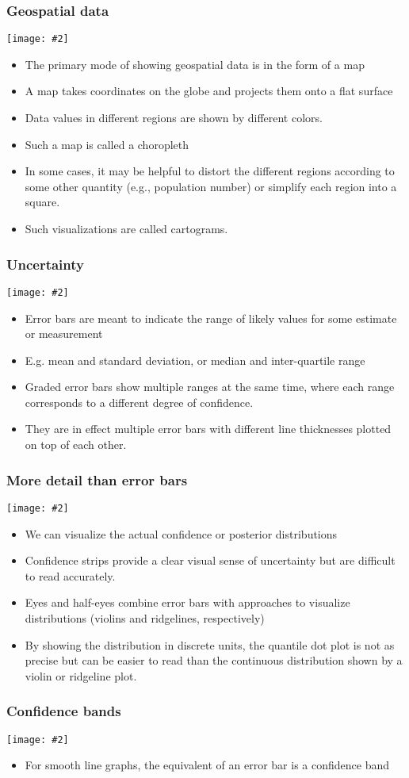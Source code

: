 \documentclass{beamer}
\newcommand{\bi}{\begin{itemize}}
\newcommand{\li}{\item}
\newcommand{\ei}{\end{itemize}}
\newcommand{\fig}[2]{\centerline{\texttt{[image: \#2]}}}
\newcommand{\bfr}[1]{\begin{frame}[fragile]\frametitle{{ #1 }}}
\begin{document}
\bfr{Geospatial data}

\fig{.9}{geospatial-1.png}
\bi
\li The primary mode of showing geospatial data is in the form of a map
\li  A map takes coordinates on the globe and projects them onto a flat surface
\li Data values in different regions are shown by different colors.
\li Such a map is called a choropleth 
\li In some cases, it may be helpful to distort the different regions according to some other quantity (e.g., population number) or simplify each region into a square. 
\li Such visualizations are called cartograms.
\ei
\end{frame}

\bfr{Uncertainty}

\fig{1}{errorbars-1.png}

\bi
\li Error bars are meant to indicate the range of likely values for some estimate or measurement
\li E.g. mean and standard deviation, or median and inter-quartile range
\li Graded error bars show multiple ranges at the same time, where each range corresponds to a different degree of confidence. 
\li They are in effect multiple error bars with different line thicknesses plotted on top of each other.
\ei

\end{frame}

\bfr{More detail than error bars}
\fig{1}{confidence-dists-1.png}

\bi
\li  We can visualize the actual confidence or posterior distributions 
\li  Confidence strips provide a clear visual sense of uncertainty but are difficult to read accurately.
\li  Eyes and half-eyes combine error bars with approaches to visualize distributions (violins and ridgelines, respectively)
\li By showing the distribution in discrete units, the quantile dot plot is not as precise but can be easier to read than the continuous distribution shown by a violin or ridgeline plot.
\ei

\end{frame}

\bfr{Confidence bands}
\fig{1}{confidence-bands-1.png}

\bi
\li For smooth line graphs, the equivalent of an error bar is a confidence band

\ei


\end{frame}
\end{document}

